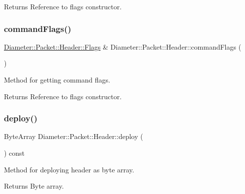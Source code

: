 \begin{DoxyReturn}{Returns}
Reference to flags constructor. 
\end{DoxyReturn}
\mbox{\label{classDiameter_1_1Packet_1_1Header_a5994bb622b639d8c10816a6479e983f7}} 
\subsubsection{\texorpdfstring{command\+Flags()}{commandFlags()}\hspace{0.1cm}{\footnotesize\ttfamily [2/2]}}
{\footnotesize\ttfamily \hyperlink{classDiameter_1_1Packet_1_1Header_1_1Flags}{Diameter\+::\+Packet\+::\+Header\+::\+Flags} \& Diameter\+::\+Packet\+::\+Header\+::command\+Flags (\begin{DoxyParamCaption}{ }\end{DoxyParamCaption})}



Method for getting command flags. 

\begin{DoxyReturn}{Returns}
Reference to flags constructor. 
\end{DoxyReturn}
\mbox{\label{classDiameter_1_1Packet_1_1Header_a49c18e76b6aadb478efc9a592323b5a3}} 
\subsubsection{\texorpdfstring{deploy()}{deploy()}\hspace{0.1cm}{\footnotesize\ttfamily [1/2]}}
{\footnotesize\ttfamily Byte\+Array Diameter\+::\+Packet\+::\+Header\+::deploy (\begin{DoxyParamCaption}{ }\end{DoxyParamCaption}) const}



Method for deploying header as byte array. 

\begin{DoxyReturn}{Returns}
Byte array. 
\end{DoxyReturn}
\mbox{\label{classDiameter_1_1Packet_1_1Header_ae60b1ea0904d4d6bb98a7e5b8cbb5d11}} 
